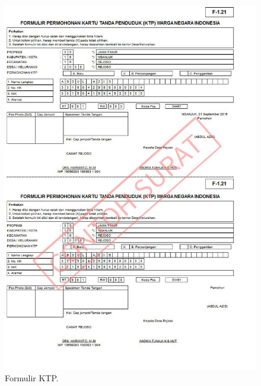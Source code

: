 \begin{figure}[H]
	\centering
	\includegraphics[width=16cm]{figures/form.jpg}
	\caption{Formulir KTP.}	
\end{figure}
